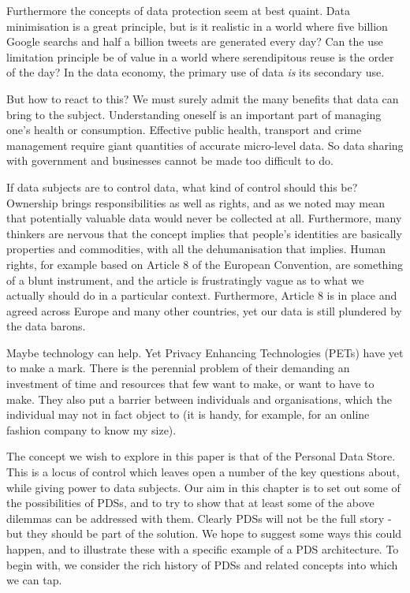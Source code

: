 \documentclass[runningheads,a4paper]{llncs}
\begin{document}
Furthermore the concepts of data protection seem at best quaint. Data minimisation is a great principle, but is it realistic in a world where five billion Google searchs and half a billion tweets are generated every day? Can the use limitation principle be of value in a world where serendipitous reuse is the order of the day? In the data economy, the primary use of data {\em is} its secondary use.

But how to react to this? We must surely admit the many benefits that data can bring to the subject. Understanding oneself is an important part of managing one's health or consumption. Effective public health, transport and crime management require giant quantities of accurate micro-level data. So data sharing with government and businesses cannot be made too difficult to do.

If data subjects are to control data, what kind of control should this be? Ownership brings responsibilities as well as rights, and as we noted may mean that potentially valuable data would never be collected at all. Furthermore, many thinkers are nervous that the concept implies that people's identities are basically properties and commodities, with all the dehumanisation that implies. Human rights, for example based on Article 8 of the European Convention, are something of a blunt instrument, and the article is frustratingly vague as to what we actually should do in a particular context. Furthermore, Article 8 is in place and agreed across Europe and many other countries, yet our data is still plundered by the data barons.

Maybe technology can help. Yet Privacy Enhancing Technologies (PETs) have yet to make a mark. There is the perennial problem of their demanding an investment of time and resources that few want to make, or want to have to make. They also put a barrier between individuals and organisations, which the individual may not in fact object to (it is handy, for example, for an online fashion company to know my size).

The concept we wish to explore in this paper is that of the Personal Data Store. This is a locus of control which leaves open a number of the key questions about, while giving power to data subjects. Our aim in this chapter is to set out some of the possibilities of PDSs, and to try to show that at least some of the above dilemmas can be addressed with them. Clearly PDSs will not be the full story - but they should be part of the solution. We hope to suggest some ways this could happen, and to illustrate these with a specific example of a PDS architecture. To begin with, we consider the rich history of PDSs and related concepts into which we can tap.
\end{document}
